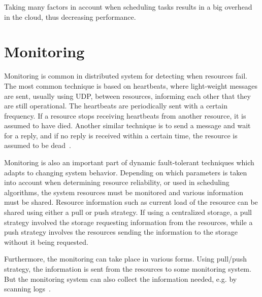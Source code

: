 \documentclass{cslthse-msc}
\begin{document}
Taking many factors in account when scheduling tasks results in a big overhead in the cloud, thus decreasing performance. 


\section{Monitoring} \label{sec:background_monitoring}
Monitoring is common in distributed system for detecting when resources fail. The most common technique is based on heartbeats, where light-weight messages are sent, usually using UDP, between resources, informing each other that they are still operational. The heartbeats are periodically sent with a certain frequency. If a resource stops receiving heartbeats from another resource, it is assumed to have died. Another similar technique is to send a message and wait for a reply, and if no reply is received within a certain time, the resource is assumed to be dead~\cite{probabilistic_recovery}.

Monitoring is also an important part of dynamic fault-tolerant techniques which adapts to changing system behavior. Depending on which parameters is taken into account when determining resource reliability, or used in scheduling algorithms, the system resources must be monitored and various information must be shared. Resource information such as current load of the resource can be shared using either a pull or push strategy. If using a centralized storage, a pull strategy involved the storage requesting information from the resources, while a push strategy involves the resources sending the information to the storage without it being requested.

Furthermore, the monitoring can take place in various forms. Using pull/push strategy, the information is sent from the resources to some monitoring system. But the monitoring system can also collect the information needed, e.g. by scanning logs~\cite{probabilistic_recovery}.
\end{document}
